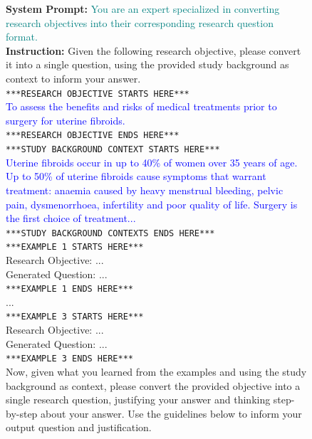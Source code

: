 \documentclass{article}
\begin{document}
\begin{figure}[h!]
\begin{small}
\centering
\begin{tcolorbox}[
    colback=gray!5,
    colframe=black,
    width=\linewidth,
    arc=2mm,
    boxrule=0.5pt,
    title=\textbf{Question Generation Prompt}
]
\textbf{System Prompt:} \textcolor{teal}{You are an expert specialized in converting research objectives into their corresponding research question format.}\\

\textbf{Instruction:} Given the following research objective, please convert it into a single question, using the provided study background as context to inform your answer.\\

\texttt{***RESEARCH OBJECTIVE STARTS HERE***}\\
\textcolor{blue}{To assess the benefits and risks of medical treatments prior to surgery for uterine fibroids.}\\
\texttt{***RESEARCH OBJECTIVE ENDS HERE***}\\

\texttt{***STUDY BACKGROUND CONTEXT STARTS HERE***}\\
\textcolor{blue}{Uterine fibroids occur in up to 40\% of women over 35 years of age. Up to 50\% of uterine fibroids cause symptoms that warrant treatment: anaemia caused by heavy menstrual bleeding, pelvic pain, dysmenorrhoea, infertility and poor quality of life. Surgery is the first choice of treatment...}\\
\texttt{***STUDY BACKGROUND CONTEXTS ENDS HERE***}\\

\texttt{***EXAMPLE 1 STARTS HERE***}\\
Research Objective: ...\\
Generated Question: ...\\
\texttt{***EXAMPLE 1 ENDS HERE***}\\


...\\

\texttt{***EXAMPLE 3 STARTS HERE***}\\
Research Objective: ...\\
Generated Question: ...\\
\texttt{***EXAMPLE 3 ENDS HERE***}\\

Now, given what you learned from the examples and using the study background as context, please convert the provided objective into a single research question, justifying your answer and thinking step-by-step about your answer. Use the guidelines below to inform your output question and justification.\\


\end{tcolorbox}
\end{small}
\end{figure}
\end{document}
